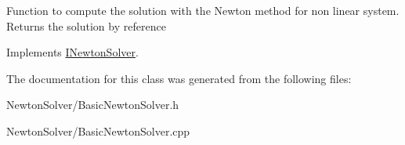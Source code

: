 Function to compute the solution with the Newton method for non linear system. Returns the solution by reference 

Implements \hyperlink{classINewtonSolver_aaf2a0a6fbf03d4f58ba24e47590458d0}{INewtonSolver}.

The documentation for this class was generated from the following files:\begin{DoxyCompactItemize}
\item 
NewtonSolver/BasicNewtonSolver.h\item 
NewtonSolver/BasicNewtonSolver.cpp\end{DoxyCompactItemize}
